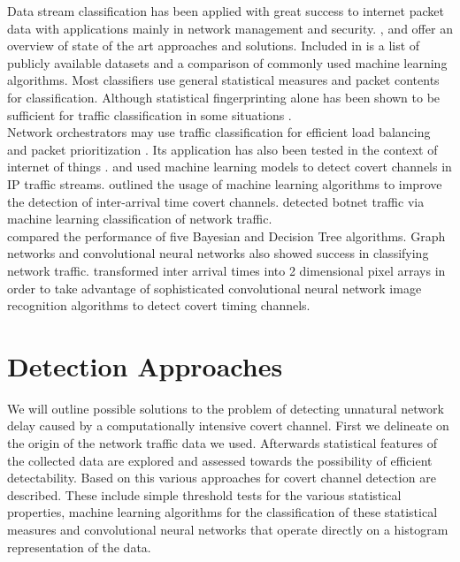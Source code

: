 \documentclass[12pt,a4paper,automark, toc=bib]{scrreprt}
\theoremstyle{definition}
\begin{document}
			Data stream classification has been applied with great success to internet packet data with applications mainly in network management and security.  \cite{Zhao2021}, \cite{Pacheco2019} and  \cite{Shahraki2022} offer an overview of state of the art approaches and solutions. Included in  \cite{Zhao2021} is a list of publicly available datasets and a comparison of commonly used machine learning algorithms. Most classifiers use general statistical measures and packet contents for classification. Although statistical fingerprinting alone has been shown to be sufficient for traffic classification in some situations  \cite{Crotti2007}.\\
			Network orchestrators may use traffic classification for efficient load balancing and packet prioritization  \cite{Manjunath2021}. Its application has also been tested in the context of internet of things  \cite{Pathmaperuma2022}.  \cite{Chourib2019} and  \cite{Saeli2020} used machine learning models to detect covert channels in IP traffic streams.  \cite{Epishkina2019a} outlined the usage of machine learning algorithms to improve the detection of inter-arrival time covert channels.  \cite{Velasco-Mata2021} detected botnet traffic via machine learning classification of network traffic. \\ 
			 \cite{Williams2006} compared the performance of five Bayesian and Decision Tree algorithms. Graph networks  \cite{Pang2021} and convolutional neural networks  \cite{Wang2018} also showed success in classifying network traffic. \cite{Al-Eidi2021} transformed inter arrival times into 2 dimensional pixel arrays in order to take advantage of sophisticated convolutional neural network image recognition algorithms to detect covert timing channels.
			
			
	\chapter{Detection Approaches}
		
		We will outline possible solutions to the problem of detecting unnatural network delay caused by a computationally intensive covert channel. First we delineate on the origin of the network traffic data we used. Afterwards statistical features of the collected data are explored and assessed towards the possibility of efficient detectability. Based on this various approaches for covert channel detection are described. These include simple threshold tests for the various statistical properties, machine learning algorithms for the classification of these statistical measures and convolutional neural networks that operate directly on a histogram representation of the data. 
		
\end{document}

